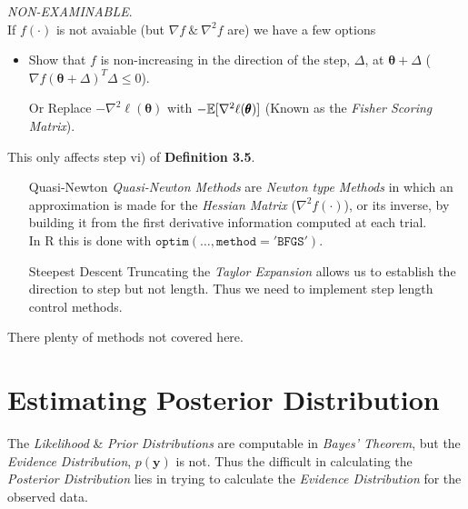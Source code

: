 \documentclass[11pt,a4paper]{article}
\begin{document}

\textit{NON-EXAMINABLE}.\\
If $f(\cdot)$ is not avaiable (but $\nabla f\ \&\ \nabla^2 f$ are) we have a few options
\begin{itemize}
	\item Show that $f$ is non-increasing in the direction of the step, $\Delta$, at $\pmb\theta+\Delta$ (\ie $\nabla f(\pmb\theta+\Delta)^T\Delta\leq0$).
	\item[Or] Replace $-\nabla^2 \ell(\pmb\theta)$ with $-\mathbb{E}[\nabla^2\ell(\pmb\theta)]$ (Known as the \textit{Fisher Scoring Matrix}).
\end{itemize}
\nb This only affects step vi) of \textbf{Definition 3.5}.\\

\begin{itemize}
	\item[Quasi-Newton] \textit{Quasi-Newton Methods} are \textit{Newton type Methods} in which an approximation is made for the \textit{Hessian Matrix} ($\nabla^2 f(\cdot)$), or its inverse, by building it from the first derivative information computed at each trial.\\
	\nb In R this is done with $\mathtt{optim(\dots,method='BFGS')}$.
	\item[Steepest Descent] Truncating the \textit{Taylor Expansion} allows us to establish the direction to step but not length. Thus we need to implement step length control methods.
\end{itemize}
\nb There plenty of methods not covered here.

\section{Estimating Posterior Distribution}
The \textit{Likelihood} \& \textit{Prior Distributions} are computable in \textit{Bayes' Theorem}, but the \textit{Evidence Distribution}, $p(\textbf{y})$ is not. Thus the difficult in calculating the \textit{Posterior Distribution} lies in trying to calculate the \textit{Evidence Distribution} for the observed data.\\

\end{document}
